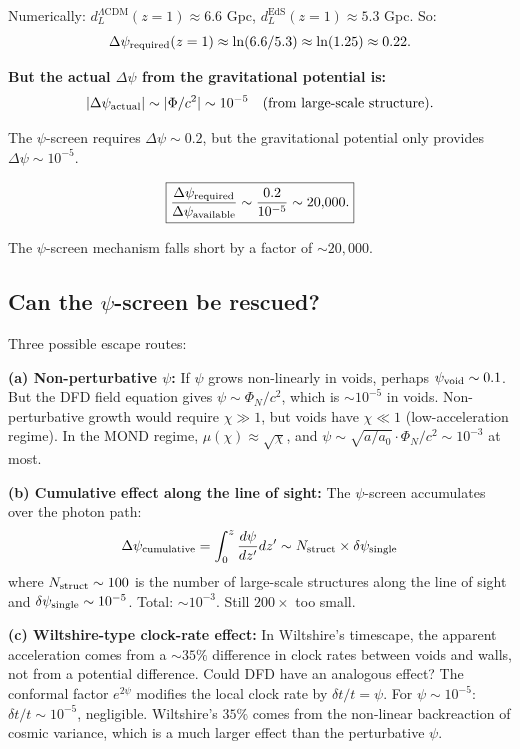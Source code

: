 \documentclass[11pt,a4paper]{article}
\begin{document}
Numerically: $d_L^{\Lambda\text{CDM}}(z=1) \approx 6.6$ Gpc, $d_L^{\text{EdS}}(z=1) \approx 5.3$ Gpc. So:
\begin{equation}
\Delta\psi_{\rm required}(z=1) \approx \ln(6.6/5.3) \approx \ln(1.25) \approx 0.22.
\end{equation}

\textbf{But the actual $\Delta\psi$ from the gravitational potential is:}
\begin{equation}
|\Delta\psi_{\rm actual}| \sim |\Phi/c^2| \sim 10^{-5} \quad \text{(from large-scale structure)}.
\end{equation}

The $\psi$-screen requires $\Delta\psi \sim 0.2$, but the gravitational potential only provides $\Delta\psi \sim 10^{-5}$.

\begin{equation}
\boxed{\frac{\Delta\psi_{\rm required}}{\Delta\psi_{\rm available}} \sim \frac{0.2}{10^{-5}} \sim 20{,}000.}
\end{equation}

The $\psi$-screen mechanism falls short by a factor of $\sim 20{,}000$.

\subsection{Can the $\psi$-screen be rescued?}

Three possible escape routes:

\textbf{(a) Non-perturbative $\psi$:} If $\psi$ grows non-linearly in voids, perhaps $\psi_{\rm void} \sim 0.1$. But the DFD field equation gives $\psi \sim \Phi_N/c^2$, which is $\sim 10^{-5}$ in voids. Non-perturbative growth would require $\chi \gg 1$, but voids have $\chi \ll 1$ (low-acceleration regime). In the MOND regime, $\mu(\chi) \approx \sqrt{\chi}$, and $\psi \sim \sqrt{a/a_0} \cdot \Phi_N / c^2 \sim 10^{-3}$ at most.

\textbf{(b) Cumulative effect along the line of sight:} The $\psi$-screen accumulates over the photon path:
\begin{equation}
\Delta\psi_{\rm cumulative} = \int_0^z \frac{d\psi}{dz'}dz' \sim N_{\rm struct} \times \delta\psi_{\rm single}
\end{equation}
where $N_{\rm struct} \sim 100$ is the number of large-scale structures along the line of sight and $\delta\psi_{\rm single} \sim 10^{-5}$. Total: $\sim 10^{-3}$. Still $200\times$ too small.

\textbf{(c) Wiltshire-type clock-rate effect:} In Wiltshire's timescape, the apparent acceleration comes from a $\sim 35\%$ difference in clock rates between voids and walls, not from a potential difference. Could DFD have an analogous effect? The conformal factor $e^{2\psi}$ modifies the local clock rate by $\delta t/t = \psi$. For $\psi \sim 10^{-5}$: $\delta t/t \sim 10^{-5}$, negligible. Wiltshire's $35\%$ comes from the non-linear backreaction of cosmic variance, which is a much larger effect than the perturbative $\psi$.
\end{document}
